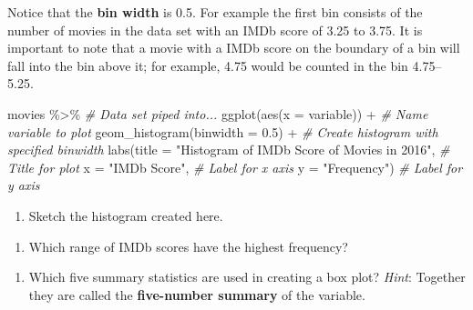 \documentclass[
]{report}
\newenvironment{Shaded}{\begin{snugshade}}{\end{snugshade}}
\newcommand{\AttributeTok}[1]{\textcolor[rgb]{0.77,0.63,0.00}{#1}}
\newcommand{\CommentTok}[1]{\textcolor[rgb]{0.56,0.35,0.01}{\textit{#1}}}
\newcommand{\FloatTok}[1]{\textcolor[rgb]{0.00,0.00,0.81}{#1}}
\newcommand{\FunctionTok}[1]{\textcolor[rgb]{0.00,0.00,0.00}{#1}}
\newcommand{\NormalTok}[1]{#1}
\newcommand{\SpecialCharTok}[1]{\textcolor[rgb]{0.00,0.00,0.00}{#1}}
\newcommand{\StringTok}[1]{\textcolor[rgb]{0.31,0.60,0.02}{#1}}
\providecommand{\tightlist}{%
  \setlength{\itemsep}{0pt}\setlength{\parskip}{0pt}}
\begin{document}
Notice that the \textbf{bin width} is 0.5. For example the first bin consists of the number of movies in the data set with an IMDb score of 3.25 to 3.75. It is important to note that a movie with a IMDb score on the boundary of a bin will fall into the bin above it; for example, 4.75 would be counted in the bin 4.75--5.25.

\begin{Shaded}
\begin{Highlighting}[]
\NormalTok{movies }\SpecialCharTok{\%\textgreater{}\%} \CommentTok{\# Data set piped into...}
\FunctionTok{ggplot}\NormalTok{(}\FunctionTok{aes}\NormalTok{(}\AttributeTok{x =}\NormalTok{ variable)) }\SpecialCharTok{+}   \CommentTok{\# Name variable to plot}
  \FunctionTok{geom\_histogram}\NormalTok{(}\AttributeTok{binwidth =} \FloatTok{0.5}\NormalTok{) }\SpecialCharTok{+}  \CommentTok{\# Create histogram with specified binwidth}
  \FunctionTok{labs}\NormalTok{(}\AttributeTok{title =} \StringTok{"Histogram of IMDb Score of Movies in 2016"}\NormalTok{, }\CommentTok{\# Title for plot}
       \AttributeTok{x =} \StringTok{"IMDb Score"}\NormalTok{, }\CommentTok{\# Label for x axis}
       \AttributeTok{y =} \StringTok{"Frequency"}\NormalTok{) }\CommentTok{\# Label for y axis}
\end{Highlighting}
\end{Shaded}

\begin{enumerate}
\def\labelenumi{\arabic{enumi}.}
\setcounter{enumi}{5}
\tightlist
\item
  Sketch the histogram created here.
\end{enumerate}

\vspace{1.4in}

\begin{enumerate}
\def\labelenumi{\arabic{enumi}.}
\setcounter{enumi}{6}
\tightlist
\item
  Which range of IMDb scores have the highest frequency?
\end{enumerate}

\vspace{0.2in}

\begin{enumerate}
\def\labelenumi{\arabic{enumi}.}
\setcounter{enumi}{7}
\tightlist
\item
  Which five summary statistics are used in creating a box plot? \emph{Hint}: Together they are called the \textbf{five-number summary} of the variable.
\end{enumerate}
\end{document}
